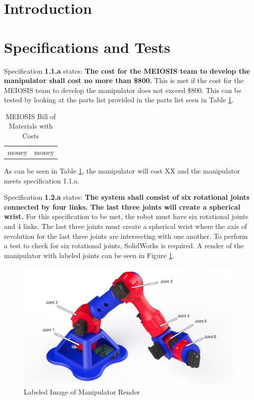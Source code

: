 \documentclass[12pt]{report}
\begin{document}
\normalem

{\tableofcontents\let\clearpage\relax\listoffigures}
\clearpage
\newpage
{}
\raggedright
\section{Introduction}\label{sec:intro}
\section{Specifications and Tests}\label{sec:tests}
Specification \textbf{1.1.a} states: \textbf{The cost for the MEIOSIS team to develop the manipulator shall cost no more than \$800.} This is met if the cost for the MEIOSIS team to develop the manipulator does not exceed \$800. This can be tested by looking at the parts list provided in the parts list seen in Table \ref{tab:bom}.

\begin{table}[htp]
  \centering
  \caption{MEIOSIS Bill of Materials with Costs}
  \label{tab:bom}
  \begin{tabular}{c|c}
      money & money\\
  \end{tabular}
\end{table}

As can be seen in Table \ref{tab:bom}, the manipulator will cost XX and the manipulator meets specification 1.1.a.

Specification \textbf{1.2.a} states: \textbf{The system shall consist of six rotational joints connected by four links. The last three joints will create a spherical wrist.} For this specification to be met, the robot must have six rotational joints and 4 links. The last three joints must create a spherical wrist where the axis of revolution for the last three joints are intersecting with one another. To perform a test to check for six rotational joints, SolidWorks is required. A render of the manipulator with labeled joints can be seen in Figure \ref{fig:manip}.


\begin{figure}[htp]
  \centering
  \includegraphics[width=.75\textwidth,frame]{manip}
  \caption{Labeled Image of Manipulator Render}
  \label{fig:manip}
\end{figure}
\end{document}
